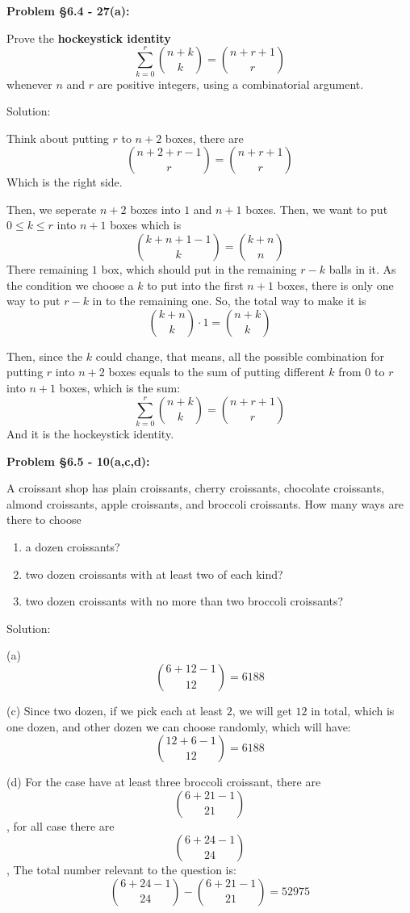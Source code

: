 \documentclass{article}
\newenvironment{problem}[1]
{\begin{mdframed}[default]
\textbf{Problem #1:}
}
{\end{mdframed}
}
\begin{document}
\begin{problem}{\S 6.4 - 27(a)}
Prove the \textbf{hockeystick identity}
\[ \sum_{k=0}^r {n+k \choose k} = {n + r + 1 \choose r } \]
whenever $n$ and $r$ are positive integers, using a combinatorial argument.

Solution:

Think about putting $r$ to $n+2$ boxes, there are \[{n+2+r-1\choose r}={n+r+1 \choose r}\] 
Which is the right side.

Then, we seperate $n+2$ boxes into $1$ and $n+1$ boxes. Then, we want to put $0\leq k \leq r$ into $n+1$ boxes which is\[{k+n+1-1 \choose k}={k+n \choose n}\]
There remaining $1$ box, which should put in the remaining $r-k$ balls in it. As the condition we choose a $k$ to put into the first $n+1$ boxes, there is only one way to put $r-k$ in to the remaining one.
So, the total way to make it is \[{k+n\choose k}\cdot 1={n+k \choose k}\]

Then, since the $k$ could change, that means, all the possible combination for putting $r$ into $n+2$ boxes equals to the sum of putting different $k$ from $0$ to $r$ into $n+1$ boxes, which is the sum:
\[\sum_{k=0}^r{n+k \choose k}={n+r+1 \choose r}\]
And it is the hockeystick identity.


\end{problem}
\begin{problem}{\S 6.5 - 10(a,c,d)}
A croissant shop has plain croissants, cherry croissants, chocolate croissants,
almond croissants, apple croissants, and broccoli croissants. How many ways are
there to choose
\begin{enumerate}
\item[(a)] a dozen croissants?
\item[(c)] two dozen croissants with at least two of each kind?
\item[(d)] two dozen croissants with no more than two broccoli croissants?
\end{enumerate}

Solution:

(a) \[{6+12-1 \choose 12}=6188\]

(c) Since two dozen, if we pick each at least $2$, we will get $12$ in total, which is one dozen, and other dozen we can choose randomly, which will have: \[{12+6-1 \choose 12}=6188\]

(d) For the case have at least three broccoli croissant, there are \[{6+21-1 \choose 21}\], for all case there are \[{6+24-1 \choose 24}\], The total number relevant to the question is: \[{6+24-1\choose 24}-{6+21-1\choose 21}=52975\]

\end{problem}
\end{document}
